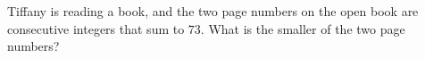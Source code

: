 Tiffany is reading a book, and the two page numbers on the open book are consecutive integers that sum to $73$. What is the smaller of the two page numbers?
